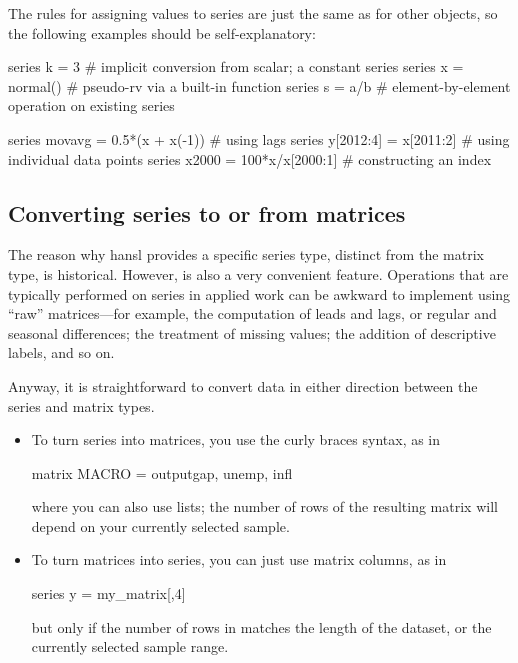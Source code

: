 The rules for assigning values to series are just the same as for
other objects, so the following examples should be self-explanatory:
\begin{code}
  series k = 3         # implicit conversion from scalar; a constant series
  series x = normal()  # pseudo-rv via a built-in function
  series s = a/b       # element-by-element operation on existing series

  series movavg = 0.5*(x + x(-1)) # using lags
  series y[2012:4] = x[2011:2]    # using individual data points
  series x2000 = 100*x/x[2000:1]  # constructing an index
\end{code}


\subsection{Converting series to or from matrices}

The reason why hansl provides a specific series type, distinct from
the matrix type, is historical. However, is also a very convenient
feature.  Operations that are typically performed on series in applied
work can be awkward to implement using ``raw'' matrices---for example,
the computation of leads and lags, or regular and seasonal
differences; the treatment of missing values; the addition of
descriptive labels, and so on.

Anyway, it is straightforward to convert data in either direction
between the series and matrix types.
\begin{itemize}
\item To turn series into matrices, you use the curly braces syntax,
  as in
  \begin{code}
    matrix MACRO = {outputgap, unemp, infl}
  \end{code}
  where you can also use lists; the number of rows of the resulting
  matrix will depend on your currently selected sample.
\item To turn matrices into series, you can just use matrix columns,
  as in
  \begin{code}
    series y = my_matrix[,4]
  \end{code}
  but only if the number of rows in  matches the
  length of the dataset, or the currently selected sample range.
\end{itemize}


